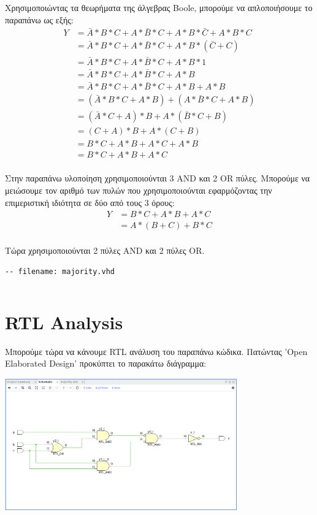 \documentclass[]{article}
\begin{document}
Χρησιμοποιώντας τα θεωρήματα της άλγεβρας Boole, μπορούμε να απλοποιήσουμε το παραπάνω ως εξής:
\begin{align*}
	Y & = \bar{A} * B * C + A * \bar{B} * C + A * B * \bar{C} + A * B * C \\
	  & = \bar{A} * B * C + A * \bar{B} * C + A * B * (\bar{C} + C)       \\
	  & = \bar{A} * B * C + A * \bar{B} * C + A * B * 1                   \\
	  & = \bar{A} * B * C + A * \bar{B} * C + A * B                       \\
	  & = \bar{A} * B * C + A * \bar{B} * C + A * B + A * B               \\
	  & = (\bar{A} * B * C + A * B) + (A * \bar{B} * C + A * B)           \\
	  & = (\bar{A} * C + A) * B + A * (\bar{B} * C + B)                   \\
	  & = (C + A) * B + A * (C + B)                                       \\
	  & = B * C + A * B + A * C + A * B                                   \\
	  & = B * C + A * B + A * C                                           \\
\end{align*}

Στην παραπάνω υλοποίηση χρησιμοποιούνται 3 AND και 2 OR πύλες. Μπορούμε να μειώσουμε τον αριθμό των πυλών που χρησιμοποιούνται εφαρμόζοντας την επιμεριστική ιδιότητα σε δύο από τους 3 όρους:
\begin{align*}
	Y & = B * C + A * B + A * C \\
	  & = A * (B + C) + B * C   \\
\end{align*}

Τώρα χρησιμοποιούνται 2 πύλες AND και 2 πύλες OR.
\begin{verbatim}
-- filename: majority.vhd
\end{verbatim}
\inputminted{vhdl}{./assign_1/majority_old.vhdl}

\section{RTL Analysis}
Μπορούμε τώρα να κάνουμε RTL ανάλυση του παραπάνω κώδικα. Πατώντας 'Open Elaborated Design'
προκύπτει το παρακάτω διάγραμμα:

\begin{center}
	\includegraphics[width=10cm]{rtl_new.png}
\end{center}
\end{document}
